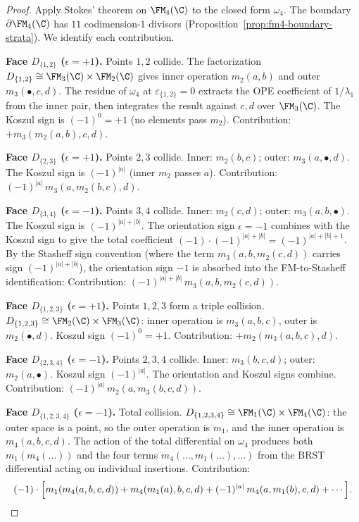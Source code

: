 \begin{proof}
Apply Stokes' theorem on $\FM_4(\C)$ to the closed form
$\omega_4$. The boundary $\partial\FM_4(\C)$ has $11$
codimension-$1$ divisors (Proposition~\ref{prop:fm4-boundary-strata}).
We identify each contribution.

\medskip\noindent
\textbf{Face $D_{\{1,2\}}$ ($\epsilon = +1$).}
Points $1, 2$ collide. The factorization
$D_{\{1,2\}} \cong \FM_3(\C) \times \FM_2(\C)$ gives
inner operation $m_2(a,b)$ and outer $m_3(\bullet, c, d)$.
The residue of $\omega_4$ at $\varepsilon_{\{1,2\}} = 0$
extracts the OPE coefficient of $1/\lambda_1$ from the
inner pair, then integrates the result against
$c, d$ over $\FM_3(\C)$. The Koszul sign is
$(-1)^0 = +1$ (no elements pass $m_2$).
Contribution: $+m_3(m_2(a,b),c,d)$.

\medskip\noindent
\textbf{Face $D_{\{2,3\}}$ ($\epsilon = +1$).}
Points $2, 3$ collide. Inner: $m_2(b,c)$; outer:
$m_3(a,\bullet,d)$. The Koszul sign is $(-1)^{|a|}$
(inner $m_2$ passes $a$).
Contribution: $(-1)^{|a|}\, m_3(a,m_2(b,c),d)$.

\medskip\noindent
\textbf{Face $D_{\{3,4\}}$ ($\epsilon = -1$).}
Points $3, 4$ collide. Inner: $m_2(c,d)$; outer:
$m_3(a,b,\bullet)$. The Koszul sign is
$(-1)^{|a|+|b|}$. The orientation sign $\epsilon = -1$
combines with the Koszul sign to give the total coefficient
$(-1) \cdot (-1)^{|a|+|b|} = (-1)^{|a|+|b|+1}$.
By the Stasheff sign convention (where the term
$m_3(a,b,m_2(c,d))$ carries sign $(-1)^{|a|+|b|}$), the
orientation sign $-1$ is absorbed into the FM-to-Stasheff
identification:
Contribution: $(-1)^{|a|+|b|}\, m_3(a,b,m_2(c,d))$.

\medskip\noindent
\textbf{Face $D_{\{1,2,3\}}$ ($\epsilon = +1$).}
Points $1, 2, 3$ form a triple collision.
$D_{\{1,2,3\}} \cong \FM_2(\C) \times \FM_3(\C)$: inner
operation is $m_3(a,b,c)$, outer is $m_2(\bullet, d)$.
Koszul sign $(-1)^0 = +1$.
Contribution: $+m_2(m_3(a,b,c), d)$.

\medskip\noindent
\textbf{Face $D_{\{2,3,4\}}$ ($\epsilon = -1$).}
Points $2, 3, 4$ collide. Inner: $m_3(b,c,d)$; outer:
$m_2(a,\bullet)$. Koszul sign $(-1)^{|a|}$.
The orientation and Koszul signs combine.
Contribution: $(-1)^{|a|}\, m_2(a, m_3(b,c,d))$.

\medskip\noindent
\textbf{Face $D_{\{1,2,3,4\}}$ ($\epsilon = -1$).}
Total collision. $D_{\{1,2,3,4\}} \cong
\FM_1(\C) \times \FM_4(\C)$: the outer space is a point,
so the outer operation is $m_1$, and the inner operation is
$m_4(a,b,c,d)$. The action of the total differential
on $\omega_4$ produces both $m_1(m_4(\ldots))$ and the
four terms $m_4(\ldots, m_1(\ldots), \ldots)$ from the
BRST differential acting on individual insertions.
Contribution:
\[
(-1) \cdot \Bigl[
m_1(m_4(a,b,c,d)) + m_4(m_1(a),b,c,d)
+ (-1)^{|a|}\, m_4(a,m_1(b),c,d)
+ \cdots
\Bigr].
\]


\end{proof}
